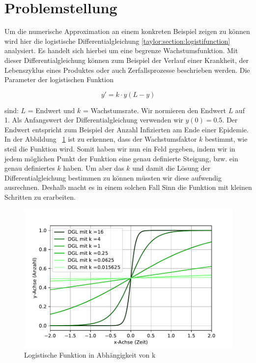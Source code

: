 %
%
%
\section{Problemstellung
\label{taylor:section:problemstellung}}
Um die numerische Approximation an einem konkreten Beispiel zeigen zu können wird hier die logistische Differentialgleichung \eqref{taylor:section:logistifunction} analysiert.
Es handelt sich hierbei um eine begrenze Wachstumsfunktion. 
Mit dieser Differentialgleichung können zum Beispiel der Verlauf einer Krankheit, der Lebenszyklus eines Produktes oder auch Zerfallsprozesse beschrieben werden. Die Parameter der logistischen Funktion

\begin{equation}
	y'
	=
	k\cdot y(L-y)
	\label{taylor:section:logistifunction}
\end{equation}

sind: $L$ = Endwert und $k$ = Wachstumsrate.
Wir normieren den Endwert $L$ auf 1. Als Anfangswert der Differentialgleichung verwenden wir $y(0)=0.5$.
Der Endwert entspricht zum Beispiel der Anzahl Infizierten am Ende einer Epidemie.
In der Abbildung ~\ref{taylor:section:fig:DGLDarstellung} ist zu erkennen, dass der Wachstumsfaktor $k$ bestimmt, wie steil die Funktion wird.
Somit haben wir nun ein Feld gegeben, indem wir in jedem möglichen Punkt der Funktion eine genau definierte Steigung, bzw. ein genau definiertes $k$ haben.
Um aber das $k$ und damit die Lösung der Differentialgleichung bestimmen zu können müssten wir diese aufwendig ausrechnen.
Deshalb macht es in einem solchen Fall Sinn die Funktion mit kleinen Schritten zu erarbeiten.

\begin{figure}
	\centering
	\includegraphics[width=12cm]{papers/taylor/taylorPictures/DGLDarstellung.pdf}
	\caption{Logistische Funktion in Abhängigkeit von k}
	\label{taylor:section:fig:DGLDarstellung}
\end{figure}

